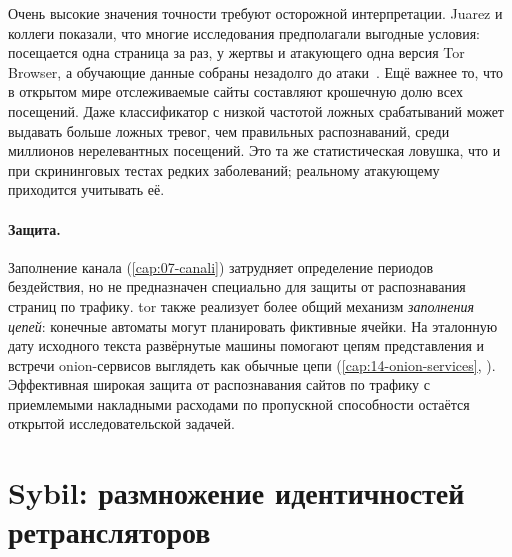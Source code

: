 \begin{approfondimento}
Очень высокие значения точности требуют осторожной интерпретации. Juarez и коллеги показали, что многие исследования предполагали выгодные условия: посещается одна страница за раз, у жертвы и атакующего одна версия Tor Browser, а обучающие данные собраны незадолго до атаки~\cite{juarez2014critical}. Ещё важнее то, что в открытом мире отслеживаемые сайты составляют крошечную долю всех посещений. Даже классификатор с низкой частотой ложных срабатываний может выдавать больше ложных тревог, чем правильных распознаваний, среди миллионов нерелевантных посещений. Это та же статистическая ловушка, что и при скрининговых тестах редких заболеваний; реальному атакующему приходится учитывать её.
\end{approfondimento}

\paragraph{Защита.} Заполнение канала (\cref{cap:07-canali}) затрудняет определение периодов бездействия, но не предназначен специально для защиты от распознавания страниц по трафику. tor также реализует более общий механизм \emph{заполнения цепей}: конечные автоматы могут планировать фиктивные ячейки. На эталонную дату исходного текста развёрнутые машины помогают цепям представления и встречи onion-сервисов выглядеть как обычные цепи (\cref{cap:14-onion-services}, ). Эффективная широкая защита от распознавания сайтов по трафику с приемлемыми накладными расходами по пропускной способности остаётся открытой исследовательской задачей.

\section{Sybil: размножение идентичностей ретрансляторов}\label{sec:att-sybil}

